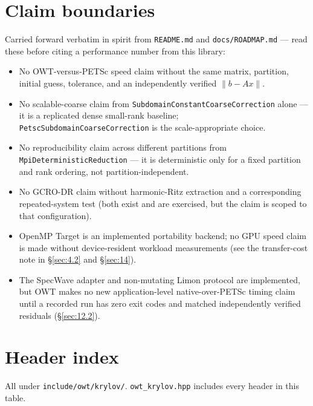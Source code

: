 \documentclass[11pt,a4paper]{report}
\newcommand{\secref}[1]{\S\ref{#1}}
\begin{document}
\chapter{Claim boundaries}
\label{sec:15}

Carried forward verbatim in spirit from \texttt{README.md} and
\texttt{docs/ROADMAP.md} --- read these before citing a performance
number from this library:

\begin{itemize}
\item No OWT-versus-PETSc speed claim without the same matrix,
  partition, initial guess, tolerance, and an independently verified
  $\|b-Ax\|$.
\item No scalable-coarse claim from \lstinline!SubdomainConstantCoarseCorrection!
  alone --- it is a replicated dense small-rank baseline;
  \lstinline!PetscSubdomainCoarseCorrection! is the scale-appropriate
  choice.
\item No reproducibility claim across different partitions from
  \lstinline!MpiDeterministicReduction! --- it is deterministic only for a
  fixed partition and rank ordering, not partition-independent.
\item No GCRO-DR claim without harmonic-Ritz extraction and a
  corresponding repeated-system test (both exist and are exercised,
  but the claim is scoped to that configuration).
\item OpenMP Target is an implemented portability backend; no GPU
  speed claim is made without device-resident workload measurements
  (see the transfer-cost note in \secref{sec:4.2} and \secref{sec:14}).
\item The SpecWave adapter and non-mutating Limon protocol are
  implemented, but OWT makes no new application-level
  native-over-PETSc timing claim until a recorded run has zero exit
  codes and matched independently verified residuals
  (\secref{sec:12.2}).
\end{itemize}

\chapter{Header index}
\label{sec:16}

All under \texttt{include/owt/krylov/}. \texttt{owt\_krylov.hpp}
includes every header in this table.

\newcommand{\flag}[1]{\texttt{OWT\allowbreak\_KRYLOV\allowbreak\_ENABLE\allowbreak\_#1}}
\end{document}
